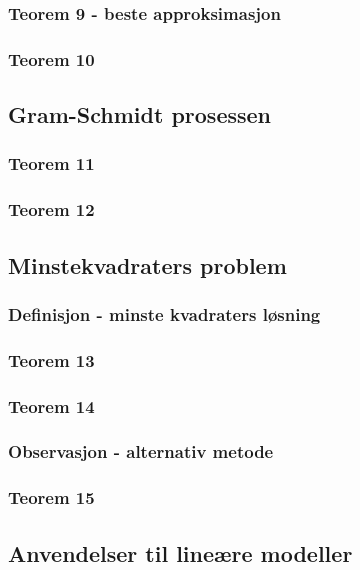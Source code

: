 \documentclass{article}
\begin{document}
      \subsubsection{Teorem 9 - beste approksimasjon}
        
      \subsubsection{Teorem 10}
        
    \subsection{Gram-Schmidt prosessen}
      \subsubsection{Teorem 11}
        
      \subsubsection{Teorem 12}
        
    \subsection{Minstekvadraters problem}
      \subsubsection{Definisjon - minste kvadraters løsning}
        
      \subsubsection{Teorem 13}
        
      \subsubsection{Teorem 14}
        
      \subsubsection{Observasjon - alternativ metode}
        
      \subsubsection{Teorem 15}
        
    \subsection{Anvendelser til lineære modeller}
\end{document}
